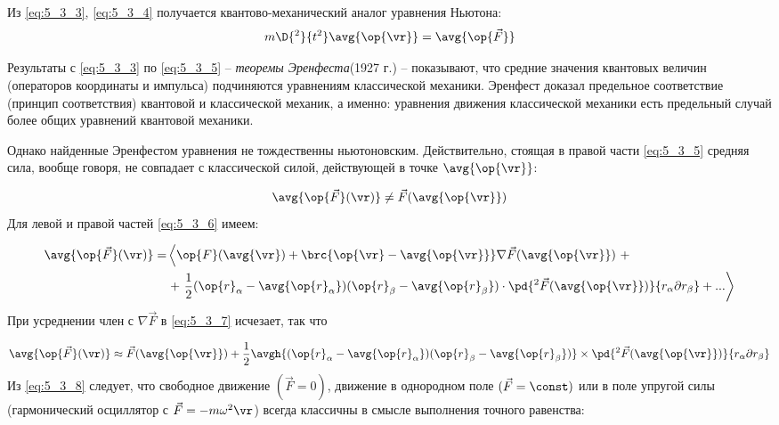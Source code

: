 Из \eqref{eq:5_3_3}, \eqref{eq:5_3_4} получается квантово-механический аналог уравнения Ньютона:
\begin{equation}
\label{eq:5_3_5}
m \D{^2}{t^2} \avg{\op{\vr}} = \avg{\op{\vec{F}}}
\end{equation}

Результаты с \eqref{eq:5_3_3} по \eqref{eq:5_3_5} -- {\em теоремы Эренфеста}\footnotemark (1927 г.) -- показывают, что средние значения квантовых величин (операторов координаты и импульса) подчиняются уравнениям классической механики. Эренфест доказал предельное соответствие (принцип соответствия) квантовой и классической механик, а именно: уравнения движения классической механики есть предельный случай более общих уравнений квантовой механики.

Однако найденные Эренфестом уравнения не тождественны ньютоновским. Действительно, стоящая в правой части \eqref{eq:5_3_5} средняя сила, вообще говоря, не совпадает с классической силой, действующей в точке $\avg{\op{\vr}}$:

\begin{equation}
\label{eq:5_3_6}
\avg{\op{\vec{F}}(\vr)} \neq \vec{F}(\avg{\op{\vr}})
\end{equation}%
%
Для левой и правой частей \eqref{eq:5_3_6} имеем:

\begin{equation}
\begin{aligned}
\label{eq:5_3_7}
\avg{\op{\vec{F}}(\vr)} = &
	\left\langle \op{F}(\avg{\vr}) + \brc{\op{\vr} - \avg{\op{\vr}}} \nabla \vec{F}(\avg{\op{\vr}})~+ \right. \\ & \left.+~
	\frac{1}{2} (\op{r}_\alpha - \avg{\op{r}_\alpha})(\op{r}_\beta - \avg{\op{r}_\beta}) \cdot \pd{^2 \vec{F}(\avg{\op{\vr}})}{r_\alpha \partial r_\beta} + ... \right\rangle
\end{aligned}  
\end{equation}%
%
При усреднении член с $\nabla \vec{F}$ в \eqref{eq:5_3_7} исчезает, так что

\begin{equation}
\label{eq:5_3_8}
\avg{\op{\vec{F}}(\vr)} \approx \vec{F}(\avg{\op{\vr}}) + \frac{1}{2} \avgh{(\op{r}_\alpha - \avg{\op{r}_\alpha})(\op{r}_\beta - \avg{\op{r}_\beta})} \times \pd{^2 \vec{F}(\avg{\op{\vr}})}{r_\alpha \partial r_\beta}
\end{equation}%
%
Из \eqref{eq:5_3_8} следует, что свободное движение $(\vec{F} = 0)$, движение в однородном поле $(\vec{F} = \const)$ или в поле упругой силы (гармонический осциллятор с $\vec{F} = - m\omega^2 \vr$) всегда классичны в смысле выполнения точного равенства:

